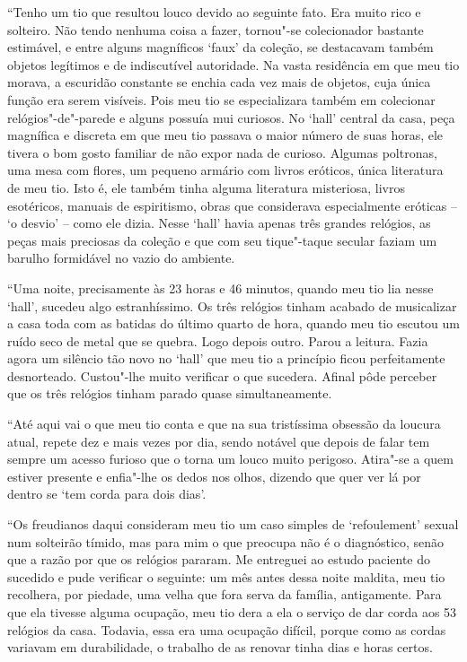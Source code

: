``Tenho um tio que resultou louco devido ao seguinte fato. Era muito
rico e solteiro. Não tendo nenhuma coisa a fazer, tornou"-se colecionador
bastante estimável, e entre alguns magníficos `faux' da coleção, se
destacavam também objetos legítimos e de indiscutível autoridade. Na
vasta residência em que meu tio morava, a escuridão constante se enchia
cada vez mais de objetos, cuja única função era serem visíveis. Pois meu
tio se especializara também em colecionar relógios"-de"-parede e alguns
possuía mui curiosos. No `hall' central da casa, peça magnífica e
discreta em que meu tio passava o maior número de suas horas, ele tivera
o bom gosto familiar de não expor nada de curioso. Algumas poltronas,
uma mesa com flores, um pequeno armário com livros eróticos, única
literatura de meu tio. Isto é, ele também tinha alguma literatura
misteriosa, livros esotéricos, manuais de espiritismo, obras que
considerava especialmente eróticas -- `o desvio' -- como ele dizia.
Nesse `hall' havia apenas três grandes relógios, as peças mais preciosas
da coleção e que com seu tique"-taque secular faziam um barulho
formidável no vazio do ambiente.

``Uma noite, precisamente às 23 horas e 46 minutos, quando meu tio lia
nesse `hall', sucedeu algo estranhíssimo. Os três relógios tinham
acabado de musicalizar a casa toda com as batidas do último quarto de
hora, quando meu tio escutou um ruído seco de metal que se quebra. Logo
depois outro. Parou a leitura. Fazia agora um silêncio tão novo no
`hall' que meu tio a princípio ficou perfeitamente desnorteado.
Custou"-lhe muito verificar o que sucedera. Afinal pôde perceber que os
três relógios tinham parado quase simultaneamente.

``Até aqui vai o que meu tio conta e que na sua tristíssima obsessão da
loucura atual, repete dez e mais vezes por dia, sendo notável que depois
de falar tem sempre um acesso furioso que o torna um louco muito
perigoso. Atira"-se a quem estiver presente e enfia"-lhe os dedos nos
olhos, dizendo que quer ver lá por dentro se `tem corda para dois dias'.

``Os freudianos daqui consideram meu tio um caso simples de
`refoulement' sexual num solteirão tímido, mas para mim o que preocupa
não é o diagnóstico, senão que a razão por que os relógios pararam. Me
entreguei ao estudo paciente do sucedido e pude verificar o seguinte: um
mês antes dessa noite maldita, meu tio recolhera, por piedade, uma velha
que fora serva da família, antigamente. Para que ela tivesse alguma
ocupação, meu tio dera a ela o serviço de dar corda aos 53 relógios da
casa. Todavia, essa era uma ocupação difícil, porque como as cordas
variavam em durabilidade, o trabalho de as renovar tinha dias e horas
certos.

